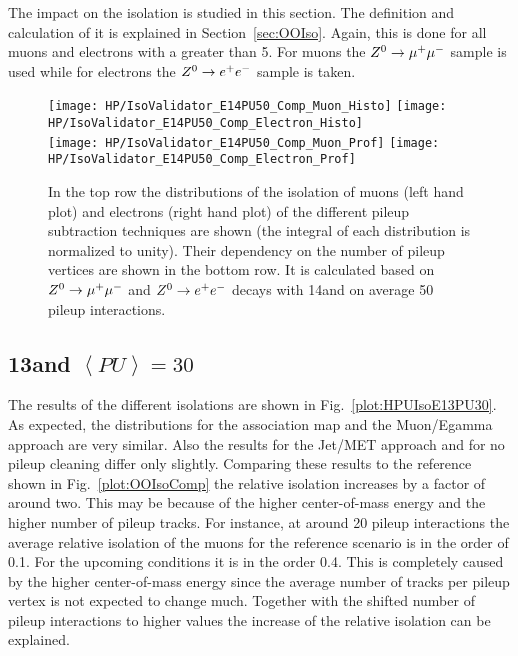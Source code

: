 The impact on the isolation is studied in this section. The definition and calculation of it is explained in Section~\ref{sec:OOIso}. Again, this is done for all muons and electrons with a \pt greater than 5\GeV. For muons the ${Z^{0}}\rightarrow\mu^+\mu^-$ sample is used while for electrons the ${Z^{0}}\rightarrow e^+e^-$ sample is taken.

\begin{figure}[Hb]
    \centering
    \texttt{[image: HP/IsoValidator\_E14PU50\_Comp\_Muon\_Histo]}
    \texttt{[image: HP/IsoValidator\_E14PU50\_Comp\_Electron\_Histo]}
    \\
    \texttt{[image: HP/IsoValidator\_E14PU50\_Comp\_Muon\_Prof]}
    \texttt{[image: HP/IsoValidator\_E14PU50\_Comp\_Electron\_Prof]}
    \caption[Distribution of the isolation of muons and electrons and their dependence on the number of pileup vertices for events with 14\TeV and $\left<PU\right>=50$]{In the top row the distributions of the isolation of muons (left hand plot) and electrons (right hand plot) of the different pileup subtraction techniques are shown (the integral of each distribution is normalized to unity). Their dependency on the number of pileup vertices are shown in the bottom row. It is calculated based on ${Z^{0}}\rightarrow\mu^+\mu^-$ and ${Z^{0}}\rightarrow e^+e^-$ decays with 14\TeV and on average 50 pileup interactions.\label{plot:HPUIsoE14PU50}}
\end{figure}

\subsection{13\TeV and $\left<PU\right>=30$ \label{sec:HPUIsoE13PU30}}

The results of the different isolations are shown in Fig.~\ref{plot:HPUIsoE13PU30}. As expected, the distributions for the association map and the Muon/Egamma approach are very similar. Also the results for the Jet/MET approach and for no pileup cleaning differ only slightly. Comparing these results to the reference shown in Fig.~\ref{plot:OOIsoComp}  the relative isolation increases by a factor of around two. This may be because of the higher center-of-mass energy and the higher number of pileup tracks. For instance, at around 20 pileup interactions the average relative isolation of the muons for the reference scenario is in the order of 0.1. For the upcoming conditions it is in the order 0.4. This is completely caused by the higher center-of-mass energy since the average number of tracks per pileup vertex is not expected to change much. Together with the shifted number of pileup interactions to higher values the increase of the relative isolation can be explained.

